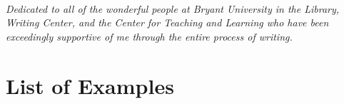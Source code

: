 \cleardoublepage
~\vfill
\begin{doublespace}
\noindent\fontsize{18}{22}\selectfont\itshape
\nohyphenation
Dedicated to all of the wonderful people at Bryant University in the Library, Writing Center, and the Center for Teaching and Learning who have been exceedingly supportive of me through the entire process of writing.
\end{doublespace}
\thispagestyle{empty}
\vfill
\vfill

\cleardoublepage


\tableofcontents

\listoffigures

\chapter*{List of Examples}

\listoftables

\cleardoublepage

